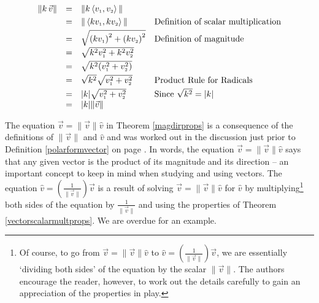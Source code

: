\[ \begin{array}{rcll}

\| k \, \vec{v} \| & = & \| k \left< v_{\mbox{\tiny $1$}}, v_{\mbox{\tiny $2$}}\right> \| & \\ [3pt]
									 & = & \| \left<kv_{\mbox{\tiny $1$}},kv_{\mbox{\tiny $2$}}\right>\| & \text{Definition of scalar multiplication} \\ [3pt]
									 & = & \sqrt{\left(kv_{\mbox{\tiny $1$}}\right)^2 + \left(kv_{\mbox{\tiny $2$}}\right)^2} & \text{Definition of magnitude} \\ [3pt]
									 & = & \sqrt{k^2v_{\mbox{\tiny $1$}}^2 + k^2v_{\mbox{\tiny $2$}}^2} & \\[3pt]
									 & = & \sqrt{k^2(v_{\mbox{\tiny $1$}}^2+v_{\mbox{\tiny $2$}}^2)} & \\ [3pt]
									 & = & \sqrt{k^2} \sqrt{v_{\mbox{\tiny $1$}}^2+v_{\mbox{\tiny $2$}}^2} & \text{Product Rule for Radicals} \\ [3pt]
									 & = & |k| \sqrt{v_{\mbox{\tiny $1$}}^2+v_{\mbox{\tiny $2$}}^2} & \text{Since $\sqrt{k^2} = |k|$} \\
									 & = & |k| \| \vec{v} \| & \\
\end{array} \]

\smallskip

The equation $\vec{v} = \| \vec{v} \| \hat{v}$ in Theorem \ref{magdirprops} is a consequence of the definitions of $\| \vec{v} \|$ and $\hat{v}$ and was worked out in the discussion just prior to Definition \ref{polarformvector} on page \pageref{polarformvectorsection}.  In words, the equation $\vec{v} = \| \vec{v} \| \hat{v}$  says that any given vector is the product of its magnitude and its direction -- an important concept to keep in mind when studying and using vectors. The equation  $\hat{v} = \left(\frac{1}{\|\vec{v}\|}\right) \vec{v}$ is a result of solving $\vec{v} = \| \vec{v} \| \hat{v}$  for $\hat{v}$ by multiplying\footnote{Of course, to go from $\vec{v} = \| \vec{v} \| \hat{v}$ to $\hat{v} = \left( \frac{1}{\|\vec{v}\|}\right) \vec{v}$, we are essentially `dividing both sides' of the equation by the scalar $\| \vec{v} \|$.  The authors encourage the reader, however, to work out the details carefully to gain an appreciation of the properties in play.} both sides of the equation by $\frac{1}{\| \vec{v} \|}$ and using the properties of Theorem \ref{vectorscalarmultprops}.  We are overdue for an example.


